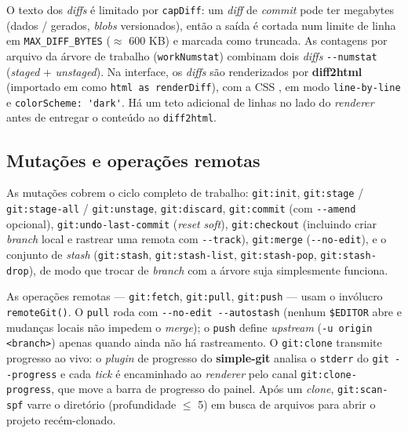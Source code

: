 O texto dos \textit{diffs} é limitado por \lstinline|capDiff|: um \textit{diff}
de \textit{commit} pode ter megabytes (dados / gerados,
\textit{blobs} versionados), então a saída é cortada num limite de linha em
\lstinline|MAX_DIFF_BYTES| ($\approx$ 600 KB) e marcada como truncada. As
contagens por arquivo da árvore de trabalho (\lstinline|workNumstat|) combinam
dois \textit{diffs} \lstinline|--numstat| (\textit{staged} + \textit{unstaged}).
Na interface, os \textit{diffs} são renderizados por \textbf{diff2html}
(importado em  como \lstinline|html as renderDiff|),
com a CSS , em modo
\lstinline|line-by-line| e \lstinline|colorScheme: 'dark'|. Há um teto adicional
de linhas no lado do \textit{renderer} antes de entregar o conteúdo ao
\lstinline|diff2html|.

\subsection{Mutações e operações remotas}

As mutações cobrem o ciclo completo de trabalho: \lstinline|git:init|,
\lstinline|git:stage| / \lstinline|git:stage-all| / \lstinline|git:unstage|,
\lstinline|git:discard|, \lstinline|git:commit| (com \lstinline|--amend|
opcional), \lstinline|git:undo-last-commit| (\textit{reset} \textit{soft}),
\lstinline|git:checkout| (incluindo criar \textit{branch} local e rastrear uma
remota com \lstinline|--track|), \lstinline|git:merge| (\lstinline|--no-edit|),
e o conjunto de \textit{stash} (\lstinline|git:stash|, \lstinline|git:stash-list|,
\lstinline|git:stash-pop|, \lstinline|git:stash-drop|), de modo que trocar de
\textit{branch} com a árvore suja simplesmente funciona.

As operações remotas — \lstinline|git:fetch|, \lstinline|git:pull|,
\lstinline|git:push| — usam o invólucro \lstinline|remoteGit()|. O
\lstinline|pull| roda com \lstinline|--no-edit --autostash| (nenhum
\lstinline|$EDITOR| abre e mudanças locais não impedem o \textit{merge}); o
\lstinline|push| define \textit{upstream} (\lstinline|-u origin <branch>|)
apenas quando ainda não há rastreamento. O \lstinline|git:clone| transmite
progresso ao vivo: o \textit{plugin} de progresso do \textbf{simple-git} analisa
o \texttt{stderr} do \lstinline|git --progress| e cada \textit{tick} é
encaminhado ao \textit{renderer} pelo canal \lstinline|git:clone-progress|, que
move a barra de progresso do painel. Após um \textit{clone}, \lstinline|git:scan-spf|
varre o diretório (profundidade $\le$ 5) em busca de arquivos  para
abrir o projeto recém-clonado.

